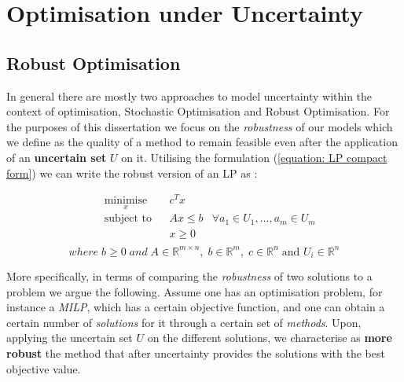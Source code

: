 \section{Optimisation under Uncertainty}
\label{section:background uncertainty}
\subsection{Robust Optimisation}
In general there are mostly two approaches to model uncertainty within the context of optimisation, Stochastic Optimisation and Robust Optimisation. For the purposes of this dissertation we focus on the \textit{robustness} of our models which we define as the quality of a method to remain feasible even after the application of an \textbf{uncertain set} $U$ on it. Utilising the formulation (\ref{equation: LP compact form}) we can write the robust version of an LP as \cite{Bertsimas2011TheoryAA}:

\vspace{\baselineskip}
\begin{equation}
\label{equation: robust compact form}
\begin{aligned}
& \underset{x}{\text{minimise}}
& & c^{T}x \\
& \text{subject to}
& & Ax \leq b & \forall a_1 \in U_1,\ldots, a_m \in U_m\\
& & & x \geq 0 \\\
\end{aligned}
\end{equation}
\[where \; b \geq 0 \; and \; A \in \mathbb{R}^{m \times n}, \; b \in \mathbb{R}^{m}, \; c \in \mathbb{R}^{n} \; \text{and }  U_i \in \mathbb{R}^{n}\]


\vspace{\baselineskip}
\noindent
More specifically, in terms of comparing the \textit{robustness} of two solutions to a problem we argue the following. Assume one has an optimisation problem, for instance a \textit{MILP}, which has a certain objective function, and one can obtain a certain number of \textit{solutions} for it through a certain set of \textit{methods}. Upon, applying the uncertain set $U$ on the different solutions, we characterise as \textbf{more robust} the method that after uncertainty provides the solutions with the best objective value.

